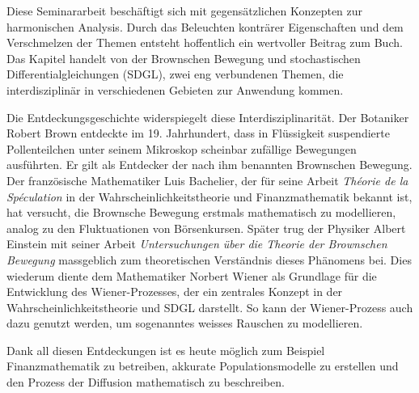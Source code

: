 %
%
%
%

Diese Seminararbeit beschäftigt sich mit gegensätzlichen Konzepten zur harmonischen Analysis. Durch das Beleuchten konträrer Eigenschaften und dem Verschmelzen der Themen entsteht hoffentlich ein wertvoller Beitrag zum Buch. Das Kapitel handelt von der Brownschen Bewegung und stochastischen Differentialgleichungen (SDGL), zwei eng verbundenen Themen, die interdisziplinär in verschiedenen Gebieten zur Anwendung kommen.

Die Entdeckungsgeschichte widerspiegelt diese Interdisziplinarität. Der Botaniker Robert Brown entdeckte im 19. Jahrhundert, dass in Flüssigkeit suspendierte Pollenteilchen unter seinem Mikroskop scheinbar zufällige Bewegungen ausführten. Er gilt als Entdecker der nach ihm benannten Brownschen Bewegung. Der französische Mathematiker Luis Bachelier, der für seine Arbeit \textit{Théorie de la Spéculation} \cite{bachelier1900théorie} in der Wahrscheinlichkeitstheorie und Finanzmathematik bekannt ist, hat versucht, die Brownsche Bewegung erstmals mathematisch zu modellieren, analog zu den Fluktuationen von Börsenkursen. Später trug der Physiker Albert Einstein mit seiner Arbeit \textit{Untersuchungen über die Theorie der Brownschen Bewegung} \cite{einstein1922untersuchungen} massgeblich zum theoretischen Verständnis dieses Phänomens bei. Dies wiederum diente dem Mathematiker Norbert Wiener als Grundlage für die Entwicklung des Wiener-Prozesses, der ein zentrales Konzept in der Wahrscheinlichkeitstheorie und SDGL darstellt. So kann der Wiener-Prozess auch dazu genutzt werden, um sogenanntes weisses Rauschen zu modellieren.

Dank all diesen Entdeckungen ist es heute möglich zum Beispiel Finanzmathematik zu betreiben, akkurate Populationsmodelle zu erstellen und den Prozess der Diffusion mathematisch zu beschreiben. %